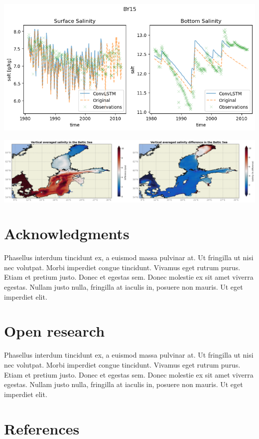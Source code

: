 \documentclass[
]{agujournal2019}
\begin{document}
\includegraphics{images/paste-5.png}

\includegraphics{images/paste-6.png}

\hypertarget{acknowledgments}{%
\section{Acknowledgments}\label{acknowledgments}}

Phasellus interdum tincidunt ex, a euismod massa pulvinar at. Ut
fringilla ut nisi nec volutpat. Morbi imperdiet congue tincidunt.
Vivamus eget rutrum purus. Etiam et pretium justo. Donec et egestas sem.
Donec molestie ex sit amet viverra egestas. Nullam justo nulla,
fringilla at iaculis in, posuere non mauris. Ut eget imperdiet elit.

\hypertarget{open-research}{%
\section{Open research}\label{open-research}}

Phasellus interdum tincidunt ex, a euismod massa pulvinar at. Ut
fringilla ut nisi nec volutpat. Morbi imperdiet congue tincidunt.
Vivamus eget rutrum purus. Etiam et pretium justo. Donec et egestas sem.
Donec molestie ex sit amet viverra egestas. Nullam justo nulla,
fringilla at iaculis in, posuere non mauris. Ut eget imperdiet elit.

\hypertarget{references}{%
\section*{References}\label{references}}
\end{document}
